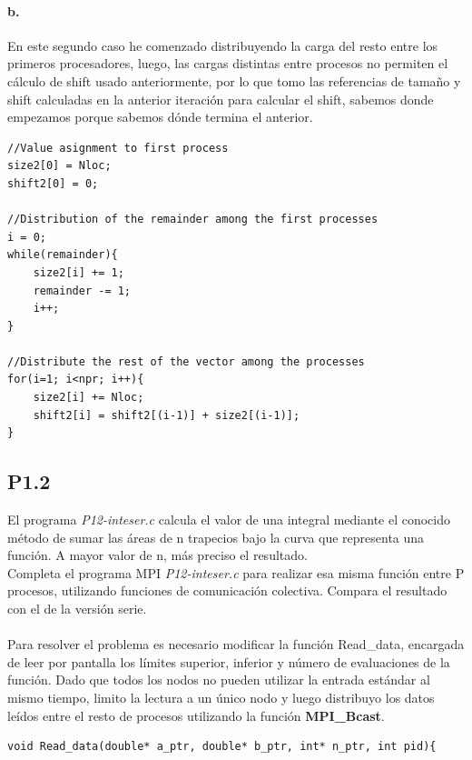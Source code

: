 \documentclass[es,gi]{ifirak}
\begin{document}
\begin{multicols}{2}
\paragraph{b.}
En este segundo caso he comenzado distribuyendo la carga del resto entre los primeros procesadores, luego,
las cargas distintas entre procesos no permiten el cálculo de shift usado anteriormente, por lo que tomo las referencias de tamaño y shift calculadas en la anterior iteración para calcular el shift, sabemos donde empezamos porque sabemos dónde termina el anterior.

\begin{lstlisting}
//Value asignment to first process  
size2[0] = Nloc;
shift2[0] = 0; 

//Distribution of the remainder among the first processes 
i = 0;
while(remainder){
	size2[i] += 1;
	remainder -= 1;
	i++;
}
	
//Distribute the rest of the vector among the processes
for(i=1; i<npr; i++){
	size2[i] += Nloc;
	shift2[i] = shift2[(i-1)] + size2[(i-1)];
}
\end{lstlisting}

\subsection{P1.2}

El programa \textit{P12-inteser.c} calcula el valor de una integral mediante el conocido método de sumar las áreas de n trapecios bajo la curva que representa una función. A mayor valor de n, más preciso el resultado.\\

Completa el programa MPI \textit{P12-inteser.c} para realizar esa misma función entre P procesos, utilizando funciones de comunicación colectiva. Compara el resultado con el de la versión serie.\\

\hline

\paragraph{}
Para resolver el problema es necesario modificar la función Read\_data, encargada de leer por pantalla los límites superior, inferior y número de evaluaciones de la función. Dado que todos los nodos no pueden utilizar la entrada estándar al mismo tiempo, limito la lectura a un único nodo y luego distribuyo los datos leídos entre el resto de procesos utilizando la función \textbf{MPI\_Bcast}.
\begin{lstlisting}
void Read_data(double* a_ptr, double* b_ptr, int* n_ptr, int pid){


\end{lstlisting}
\end{multicols}
\end{document}
